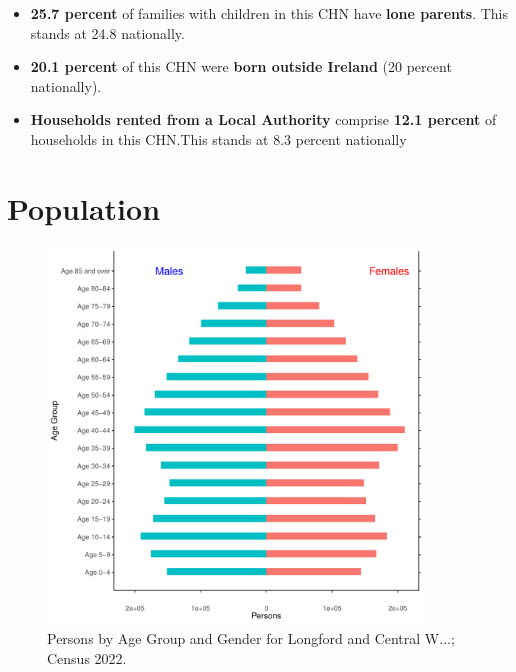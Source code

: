 \documentclass{article}
\begin{document}
\begin{itemize}
\item \textbf{25.7 percent} of families with children in this CHN have \textbf{lone parents}. This stands at 24.8 nationally.

\item \textbf{20.1 percent} of this CHN were \textbf{born outside Ireland} (20 percent nationally).

\item \textbf{Households rented from a Local Authority} comprise \textbf{12.1 percent} of households in this CHN.This stands at 8.3 percent nationally

\end{itemize}

\pagebreak

\section{Population} 
\label{sect:Pop}

\begin{figure}[h]
	\centering
	\includegraphics[width = 100mm]{../figures/PyramidPlot.pdf}
	\caption{Persons by Age Group and Gender for Longford and Central W...; Census 2022.}
	\label{fig:2ae19629-1a6a-13a3-e055-000000000001}
	\end{figure}
\end{document}
